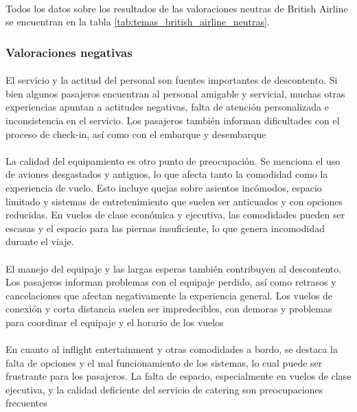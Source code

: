 \documentclass{report}
\begin{document}
                    \paragraph*{}{
                        Todos los datos sobre los resultados de las valoraciones neutras de British Airline se encuentran en la tabla \ref{tab:temas_british_airline_neutras}.
                    }
                \subsubsection*{Valoraciones negativas}
                    \paragraph*{}{
                        El servicio y la actitud del personal son fuentes importantes de descontento. Si bien algunos pasajeros encuentran al personal amigable y servicial, muchas otras experiencias apuntan a actitudes negativas, falta de atención personalizada e inconsistencia en el servicio. Los pasajeros también informan dificultades con el proceso de check-in, así como con el embarque y desembarque
                    }
                    \paragraph*{}{
                        La calidad del equipamiento es otro punto de preocupación. Se menciona el uso de aviones desgastados y antiguos, lo que afecta tanto la comodidad como la experiencia de vuelo. Esto incluye quejas sobre asientos incómodos, espacio limitado y sistemas de entretenimiento que suelen ser anticuados y con opciones reducidas. En vuelos de clase económica y ejecutiva, las comodidades pueden ser escasas y el espacio para las piernas insuficiente, lo que genera incomodidad durante el viaje.
                    }
                    \paragraph*{}{
                        El manejo del equipaje y las largas esperas también contribuyen al descontento. Los pasajeros informan problemas con el equipaje perdido, así como retrasos y cancelaciones que afectan negativamente la experiencia general. Los vuelos de conexión y corta distancia suelen ser impredecibles, con demoras y problemas para coordinar el equipaje y el horario de los vuelos
                    }
                    \paragraph*{}{
                        En cuanto al inflight entertainment y otras comodidades a bordo, se destaca la falta de opciones y el mal funcionamiento de los sistemas, lo cual puede ser frustrante para los pasajeros. La falta de espacio, especialmente en vuelos de clase ejecutiva, y la calidad deficiente del servicio de catering son preocupaciones frecuentes
                    }
\end{document}

